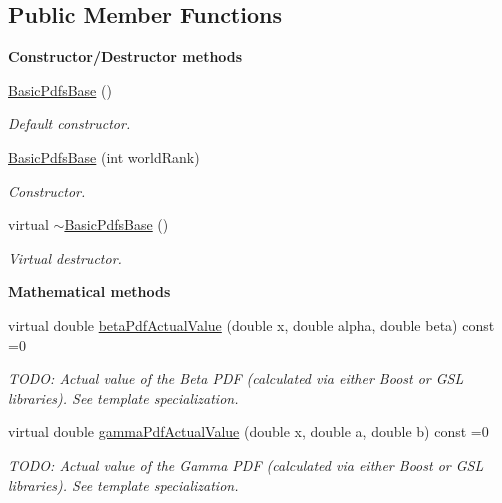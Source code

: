 \subsection*{Public Member Functions}
\begin{Indent}{\bf Constructor/\-Destructor methods}\par
\begin{DoxyCompactItemize}
\item 
\hyperlink{class_q_u_e_s_o_1_1_basic_pdfs_base_a2ca589bc1e025d7e84a0b029b4c610a1}{Basic\-Pdfs\-Base} ()
\begin{DoxyCompactList}\small\item\em Default constructor. \end{DoxyCompactList}\item 
\hyperlink{class_q_u_e_s_o_1_1_basic_pdfs_base_acf3bfe40802cd488d9d01077a7d15e55}{Basic\-Pdfs\-Base} (int world\-Rank)
\begin{DoxyCompactList}\small\item\em Constructor. \end{DoxyCompactList}\item 
virtual \hyperlink{class_q_u_e_s_o_1_1_basic_pdfs_base_a4e0421cd14da7b04d4242318c7de5ece}{$\sim$\-Basic\-Pdfs\-Base} ()
\begin{DoxyCompactList}\small\item\em Virtual destructor. \end{DoxyCompactList}\end{DoxyCompactItemize}
\end{Indent}
\begin{Indent}{\bf Mathematical methods}\par
\begin{DoxyCompactItemize}
\item 
virtual double \hyperlink{class_q_u_e_s_o_1_1_basic_pdfs_base_a7a4df6a4b2147eeca4efb22db0ae1b8b}{beta\-Pdf\-Actual\-Value} (double x, double alpha, double beta) const =0
\begin{DoxyCompactList}\small\item\em T\-O\-D\-O\-: Actual value of the Beta P\-D\-F (calculated via either Boost or G\-S\-L libraries). See template specialization. \end{DoxyCompactList}\item 
virtual double \hyperlink{class_q_u_e_s_o_1_1_basic_pdfs_base_ae5c0c0a14b0f5b89f64e0cd9c0a1b9fd}{gamma\-Pdf\-Actual\-Value} (double x, double a, double b) const =0
\begin{DoxyCompactList}\small\item\em T\-O\-D\-O\-: Actual value of the Gamma P\-D\-F (calculated via either Boost or G\-S\-L libraries). See template specialization. \end{DoxyCompactList}\end{DoxyCompactItemize}
\end{Indent}
